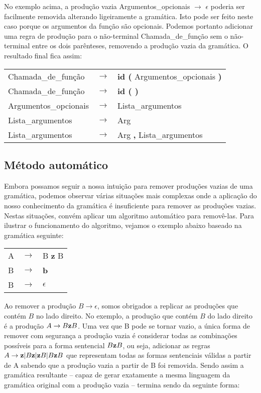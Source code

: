 \documentclass{compiladores}
\renewcommand{\flecha}{\rightarrow}
\newcommand{\flech}{$\rightarrow$}
\begin{document}
No exemplo acima, a produção vazia Argumentos\_opcionais \flech
$\epsilon$ poderia ser facilmente removida alterando ligeiramente a
gramática. Isto pode ser feito neste caso porque os argumentos da
função são opcionais. Podemos portanto adicionar uma regra de produção
para o não-terminal Chamada\_de\_função sem o não-terminal entre os
dois parênteses, removendo a produção vazia da gramática. O resultado
final fica assim:

\begin{center}
\begin{tabular}{lll}
Chamada\_de\_função   & \flech & {\bf id (} Argumentos\_opcionais {\bf )}\\
Chamada\_de\_função   & \flech & {\bf id ( )}\\
Argumentos\_opcionais & \flech & Lista\_argumentos \\
Lista\_argumentos     & \flech & Arg \\
Lista\_argumentos     & \flech & Arg {\bf ,} Lista\_argumentos \\
\end{tabular}
\end{center}

\subsection{Método automático}

Embora possamos seguir a nossa intuição para remover produções vazias
de uma gramática, podemos observar várias situações mais complexas
onde a aplicação do nosso conhecimento da gramática é insuficiente
para remover as produções vazias. Nestas situações, convém aplicar um
algoritmo automático para removê-las. Para ilustrar o funcionamento do
algoritmo, vejamos o exemplo abaixo baseado na gramática seguinte:

\begin{center}
\begin{tabular}{lll}
A & \flech & B {\bf z} B \\
B & \flech & {\bf b} \\
B & \flech & $\epsilon$ \\
\end{tabular}
\end{center}

Ao remover a produção $B \flecha \epsilon$, somos obrigados a replicar
as produções que contém $B$ no lado direito. No exemplo, a produção
que contém $B$ do lado direito é a produção $A \flecha B {\bf z}
B$. Uma vez que B pode se tornar vazio, a única forma de remover com
segurança a produção vazia é considerar todas as combinações possíveis
para a forma sentencial $B{\bf z}B$, ou seja, adicionar as regras $A
\flecha {\bf z} \vert B {\bf z} \vert {\bf z} B \vert B {\bf z} B$ que
representam todas as formas sentenciais válidas a partir de A sabendo
que a produção vazia a partir de B foi removida. Sendo assim a
gramática resultante -- capaz de gerar exatamente a mesma linguagem da
gramática original com a produção vazia -- termina sendo da seguinte forma:
\end{document}
